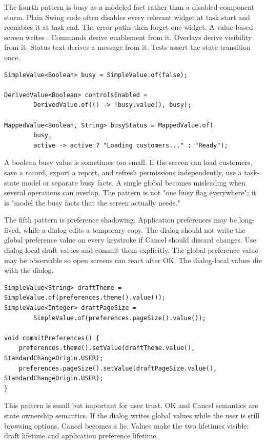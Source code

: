 The fourth pattern is busy as a modeled fact rather than a disabled-component
storm. Plain Swing code often disables every relevant widget at task start and
reenables it at task end. The error paths then forget one widget. A value-based
screen writes . Commands derive enablement from it. Overlays derive
visibility from it. Status text derives a message from it. Tests assert the
state transition once.

\begin{lstlisting}[caption={Busy state as a source for several presentation facts.}]
SimpleValue<Boolean> busy = SimpleValue.of(false);

DerivedValue<Boolean> controlsEnabled =
        DerivedValue.of(() -> !busy.value(), busy);

MappedValue<Boolean, String> busyStatus = MappedValue.of(
        busy,
        active -> active ? "Loading customers..." : "Ready");
\end{lstlisting}

A boolean busy value is sometimes too small. If the screen can load customers,
save a record, export a report, and refresh permissions independently, use a
task-state model or separate busy facts. A single global  becomes
misleading when several operations can overlap. The pattern is not "one busy
flag everywhere"; it is "model the busy facts that the screen actually needs."

The fifth pattern is preference shadowing. Application preferences may be
long-lived, while a dialog edits a temporary copy. The dialog should not write
the global preference value on every keystroke if Cancel should discard changes.
Use dialog-local draft values and commit them explicitly. The global preference
value may be observable so open screens can react after OK. The dialog-local
values die with the dialog.

\begin{lstlisting}[caption={A preference dialog edits local values and commits.}]
SimpleValue<String> draftTheme = SimpleValue.of(preferences.theme().value());
SimpleValue<Integer> draftPageSize =
        SimpleValue.of(preferences.pageSize().value());

void commitPreferences() {
    preferences.theme().setValue(draftTheme.value(), StandardChangeOrigin.USER);
    preferences.pageSize().setValue(draftPageSize.value(), StandardChangeOrigin.USER);
}
\end{lstlisting}

This pattern is small but important for user trust. OK and Cancel semantics are
state ownership semantics. If the dialog writes global values while the user is
still browsing options, Cancel becomes a lie. Values make the two lifetimes
visible: draft lifetime and application preference lifetime.

